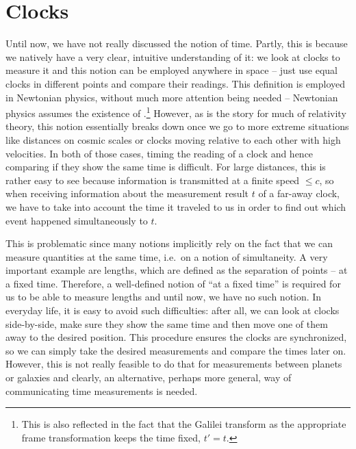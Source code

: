 \documentclass[../relativity_main.tex]{subfiles}
\begin{document}
	\section{Clocks}\label{sec:clocks}
Until now, we have not really discussed the notion of time. Partly, this is because we natively have a very clear, intuitive understanding of it: we look at clocks to measure it and this notion can be employed anywhere in space -- just use equal clocks in different points and compare their readings. This definition is employed in Newtonian physics, without much more attention being needed -- Newtonian physics assumes the existence of .\footnote{This is also reflected in the fact that the Galilei transform as the appropriate frame transformation keeps the time fixed, $t' = t$.} However, as is the story for much of relativity theory, this notion essentially breaks down once we go to more extreme situations like distances on cosmic scales or clocks moving relative to each other with high velocities. In both of those cases, timing the reading of a clock and hence comparing if they show the same time is difficult. For large distances, this is rather easy to see because information is transmitted at a finite speed $\leq c$, so when receiving information about the measurement result $t$ of a far-away clock, we have to take into account the time it traveled to us in order to find out which event happened simultaneously to $t$.

This is problematic since many notions implicitly rely on the fact that we can measure quantities at the same time, i.e.~on a notion of simultaneity. A very important example are lengths, which are defined as the separation of points -- at a fixed time. Therefore, a well-defined notion of \enquote{at a fixed time} is required for us to be able to measure lengths and until now, we have no such notion. In everyday life, it is easy to avoid such difficulties: after all, we can look at clocks side-by-side, make sure they show the same time and then move one of them away to the desired position. This procedure ensures the clocks are synchronized, so we can simply take the desired measurements and compare the times later on. However, this is not really feasible to do that for measurements between planets or galaxies and clearly, an alternative, perhaps more general, way of communicating time measurements is needed.
\end{document}
